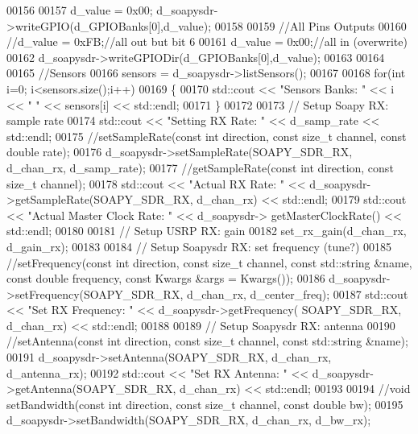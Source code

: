 \begin{DoxyCode}
00156 
00157       d_value = 0x00; d_soapysdr->writeGPIO(d_GPIOBanks[0],d_value);
00158 
00159       \textcolor{comment}{//All Pins Outputs}
00160       \textcolor{comment}{//d\_value = 0xFB;//all out but bit 6}
00161       d_value = 0x00;\textcolor{comment}{//all in (overwrite)}
00162       d_soapysdr->writeGPIODir(d_GPIOBanks[0],d_value);
00163 
00164 
00165       \textcolor{comment}{//Sensors}
00166       sensors = d_soapysdr->listSensors();
00167 
00168       \textcolor{keywordflow}{for}(\textcolor{keywordtype}{int} i=0; i<sensors.size();i++)
00169       \{
00170         std::cout << \textcolor{stringliteral}{"Sensors Banks: "} << i << \textcolor{stringliteral}{" "} << sensors[i] << std::endl;
00171       \}
00172 
00173       \textcolor{comment}{// Setup Soapy RX: sample rate}
00174       std::cout << \textcolor{stringliteral}{"Setting RX Rate: "} << d_samp_rate << std::endl;
00175       \textcolor{comment}{//setSampleRate(const int direction, const size\_t channel, const double rate);}
00176       d_soapysdr->setSampleRate(SOAPY_SDR_RX, d_chan_rx, d_samp_rate);
00177       \textcolor{comment}{//getSampleRate(const int direction, const size\_t channel);}
00178       std::cout << \textcolor{stringliteral}{"Actual RX Rate: "} << d_soapysdr->getSampleRate(SOAPY_SDR_RX, 
      d_chan_rx) << std::endl;
00179       std::cout << \textcolor{stringliteral}{"Actual Master Clock Rate: "} << d_soapysdr->
      getMasterClockRate() << std::endl;
00180 
00181       \textcolor{comment}{// Setup USRP RX: gain}
00182       set_rx_gain(d_chan_rx, d_gain_rx);
00183 
00184       \textcolor{comment}{// Setup Soapysdr RX: set frequency (tune?)}
00185       \textcolor{comment}{//setFrequency(const int direction, const size\_t channel, const std::string &name, const double
       frequency, const Kwargs &args = Kwargs());}
00186       d_soapysdr->setFrequency(SOAPY_SDR_RX, d_chan_rx, d_center_freq);
00187       std::cout << \textcolor{stringliteral}{"Set RX Frequency: "}  << d_soapysdr->getFrequency(
      SOAPY_SDR_RX, d_chan_rx) << std::endl;
00188 
00189       \textcolor{comment}{// Setup Soapysdr RX: antenna}
00190       \textcolor{comment}{//setAntenna(const int direction, const size\_t channel, const std::string &name);}
00191       d_soapysdr->setAntenna(SOAPY_SDR_RX, d_chan_rx, d_antenna_rx);
00192       std::cout << \textcolor{stringliteral}{"Set RX Antenna: "}  << d_soapysdr->getAntenna(SOAPY_SDR_RX, 
      d_chan_rx) << std::endl;
00193 
00194       \textcolor{comment}{//void setBandwidth(const int direction, const size\_t channel, const double bw);}
00195       d_soapysdr->setBandwidth(SOAPY_SDR_RX, d_chan_rx, d_bw_rx);

\end{DoxyCode}
